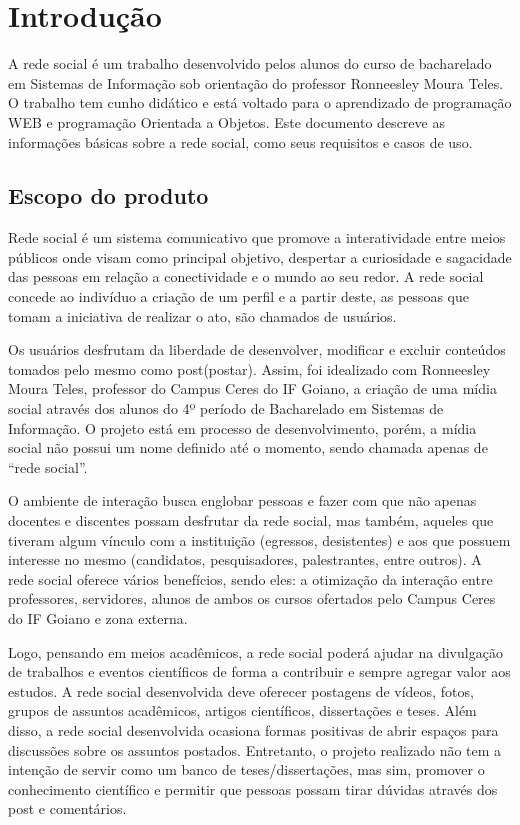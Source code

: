 \chapter{Introdução}

A rede social é um trabalho desenvolvido pelos alunos do curso de bacharelado em Sistemas de Informação sob orientação do professor Ronneesley Moura Teles.
O trabalho tem cunho didático e está voltado para o aprendizado de programação WEB e programação Orientada a Objetos.
Este documento descreve as informações básicas sobre a rede social, como seus requisitos e casos de uso.


\section{Escopo do produto}
Rede social é um sistema comunicativo que promove a interatividade entre meios públicos
onde visam como principal objetivo, despertar a curiosidade e sagacidade das pessoas em relação a
conectividade e o mundo ao seu redor. A rede social concede ao indivíduo a criação de um perfil e a
partir deste, as pessoas que tomam a iniciativa de realizar o ato, são chamados de usuários.

Os usuários desfrutam da liberdade de desenvolver, modificar e excluir conteúdos tomados
pelo mesmo como post(postar). Assim, foi idealizado com Ronneesley Moura Teles, professor do
Campus Ceres do IF Goiano, a criação de uma mídia social através dos alunos do 4º período de
Bacharelado em Sistemas de Informação. O projeto está em processo de desenvolvimento, porém, a
mídia social não possui um nome definido até o momento, sendo chamada apenas de “rede social”.

O ambiente de interação busca englobar pessoas e fazer com que não apenas docentes e
discentes possam desfrutar da rede social, mas também, aqueles que tiveram algum vínculo com a
instituição (egressos, desistentes) e aos que possuem interesse no mesmo (candidatos,
pesquisadores, palestrantes, entre outros). A rede social oferece vários benefícios, sendo eles: a
otimização da interação entre professores, servidores, alunos de ambos os cursos ofertados pelo
Campus Ceres do IF Goiano e zona externa.

Logo, pensando em meios acadêmicos, a rede social poderá ajudar na divulgação de trabalhos
e eventos científicos de forma a contribuir e sempre agregar valor aos estudos. A rede social
desenvolvida deve oferecer postagens de vídeos, fotos, grupos de assuntos acadêmicos, artigos
científicos, dissertações e teses. Além disso, a rede social desenvolvida ocasiona formas positivas de
abrir espaços para discussões sobre os assuntos postados. Entretanto, o projeto realizado não tem a
intenção de servir como um banco de teses/dissertações, mas sim, promover o conhecimento
científico e permitir que pessoas possam tirar dúvidas através dos post e comentários.
  

